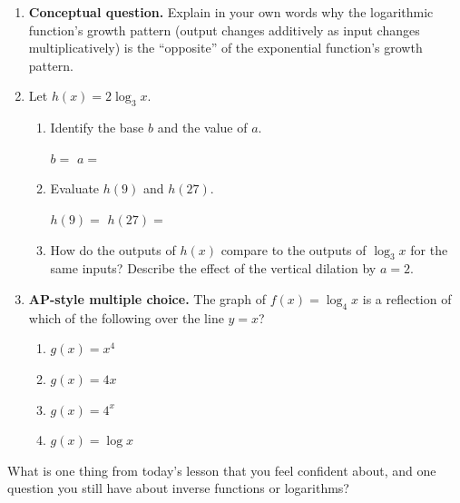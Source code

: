 \documentclass[10pt]{article}
\begin{document}
\begin{enumerate}[leftmargin=1.8em, itemsep=14pt]
\begin{enumerate}[leftmargin=1.5em, itemsep=6pt, label=\alph*.]
  \vspace{4pt}
  $t(A) = $ \blank{4cm}

  \item Evaluate $t(1000)$. What does this value represent in context?

  \vspace{4pt}
  $t(1000) = $ \blank{3cm}

  \vspace{4pt}
  In context: \writeline
\end{enumerate}

\item \textbf{Conceptual question.} Explain in your own words why the logarithmic function's
      growth pattern (output changes additively as input changes multiplicatively) is the
      ``opposite'' of the exponential function's growth pattern.


\item Let $h(x) = 2\log_3 x$.

\begin{enumerate}[leftmargin=1.5em, itemsep=6pt, label=\alph*.]
  \item Identify the base $b$ and the value of $a$.

  \vspace{4pt}
  $b = $ \blank{2cm} \qquad $a = $ \blank{2cm}

  \item Evaluate $h(9)$ and $h(27)$.

  \vspace{4pt}
  $h(9) = $ \blank{3cm} \qquad $h(27) = $ \blank{3cm}

  \item How do the outputs of $h(x)$ compare to the outputs of $\log_3 x$ for the same
        inputs? Describe the effect of the vertical dilation by $a = 2$.

  \writeline
\end{enumerate}

\item \textbf{AP-style multiple choice.} The graph of $f(x) = \log_4 x$ is a reflection of
      which of the following over the line $y = x$?

\vspace{6pt}
\begin{enumerate}[leftmargin=2em, itemsep=4pt, label=(\Alph*)]
  \item $g(x) = x^4$
  \item $g(x) = 4x$
  \item $g(x) = 4^x$
  \item $g(x) = \log x$
\end{enumerate}

\end{enumerate}

\vspace{0.12in}

\begin{reflectionbox}
What is one thing from today's lesson that you feel confident about, and one question you
still have about inverse functions or logarithms?

\end{reflectionbox}
\end{document}

